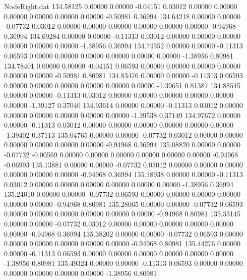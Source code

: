 \begin{filecontents}{NodeRight.dat}
 134.58125    0.00000    0.00000    -0.04151    0.03012    0.00000    0.00000    0.00000    0.00000    0.00000    0.00000   -0.50981    0.36994
 134.64218    0.00000    0.00000    -0.07732    0.03012    0.00000    0.00000    0.00000    0.00000    0.00000    0.00000   -0.94968    0.36994
 134.69284    0.00000    0.00000    -0.11313    0.03012    0.00000    0.00000    0.00000    0.00000    0.00000    0.00000   -1.38956    0.36994
 134.74352    0.00000    0.00000    -0.11313    0.06593    0.00000    0.00000    0.00000    0.00000    0.00000    0.00000   -1.38956    0.80981
 134.78401    0.00000    0.00000    -0.04151    0.06593    0.00000    0.00000    0.00000    0.00000    0.00000    0.00000   -0.50981    0.80981
 134.83476    0.00000    0.00000    -0.11313    0.06593    0.00000    0.00000    0.00000    0.00000    0.00000    0.00000   -1.39651    0.81387
 134.88545    0.00000    0.00000    -0.11313    0.03012    0.00000    0.00000    0.00000    0.00000    0.00000    0.00000   -1.39127    0.37040
 134.93614    0.00000    0.00000    -0.11313    0.03012    0.00000    0.00000    0.00000    0.00000    0.00000    0.00000   -1.39538    0.37149
 134.97672    0.00000    0.00000    -0.11313    0.03012    0.00000    0.00000    0.00000    0.00000    0.00000    0.00000   -1.39402    0.37113
 135.04765    0.00000    0.00000    -0.07732    0.03012    0.00000    0.00000    0.00000    0.00000    0.00000    0.00000   -0.94968    0.36994
 135.08820    0.00000    0.00000    -0.07732   -0.00569    0.00000    0.00000    0.00000    0.00000    0.00000    0.00000   -0.94968   -0.06993
 135.13881    0.00000    0.00000    -0.07732    0.03012    0.00000    0.00000    0.00000    0.00000    0.00000    0.00000   -0.94968    0.36994
 135.18938    0.00000    0.00000    -0.11313    0.03012    0.00000    0.00000    0.00000    0.00000    0.00000    0.00000   -1.38956    0.36994
 135.24010    0.00000    0.00000    -0.07732    0.06593    0.00000    0.00000    0.00000    0.00000    0.00000    0.00000   -0.94968    0.80981
 135.28065    0.00000    0.00000    -0.07732    0.06593    0.00000    0.00000    0.00000    0.00000    0.00000    0.00000   -0.94968    0.80981
 135.33145    0.00000    0.00000    -0.07732    0.03012    0.00000    0.00000    0.00000    0.00000    0.00000    0.00000   -0.94968    0.36994
 135.38202    0.00000    0.00000    -0.07732    0.06593    0.00000    0.00000    0.00000    0.00000    0.00000    0.00000   -0.94968    0.80981
 135.44276    0.00000    0.00000    -0.11313    0.06593    0.00000    0.00000    0.00000    0.00000    0.00000    0.00000   -1.38956    0.80981
 135.49324    0.00000    0.00000    -0.11313    0.06593    0.00000    0.00000    0.00000    0.00000    0.00000    0.00000   -1.38956    0.80981

\end{filecontents}
